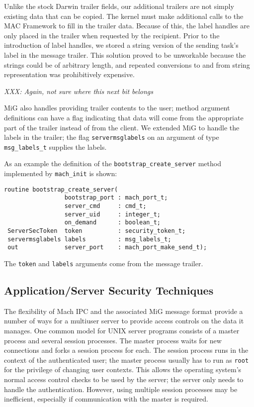 Unlike the stock Darwin trailer fields, our additional trailers are
not simply existing data that can be copied.  The kernel must make
additional calls to the MAC Framework to fill in the trailer data.
Because of this, the label handles are only placed in the trailer
when requested by the recipient. Prior to the introduction of label
handles, we stored a string version of the sending task's label in
the message trailer.  This solution proved to be unworkable because
the strings could be of arbitrary length, and repeated conversions
to and from string representation was prohibitively expensive.

\textit{XXX: Again, not sure where this next bit belongs}

MiG also handles providing trailer contents to the user; method argument definitions can
have a flag indicating that data will come from the appropriate part of the trailer instead
of from the client. We extended MiG to handle the labels in the trailer; the flag
{\tt servermsglabels} on an argument of type {\tt msg\_labels\_t} supplies the labels.
\begin{samepage}
As an example the definition of the {\tt bootstrap\_create\_server} method implemented by
{\tt mach\_init} is shown:
\begin{verbatim}
routine bootstrap_create_server(
                 bootstrap_port : mach_port_t;
                 server_cmd     : cmd_t;
                 server_uid     : integer_t;
                 on_demand      : boolean_t;
 ServerSecToken  token          : security_token_t;
 servermsglabels labels         : msg_labels_t;
 out             server_port    : mach_port_make_send_t);
\end{verbatim}
\end{samepage}

The {\tt token} and {\tt labels} arguments come from the message trailer.

\subsection{Application/Server Security Techniques}

The flexibility of Mach IPC and the associated MiG message format provide a number
of ways for a multiuser server to provide access controls on the data it manages.
One common model for UNIX server programs consists of a master process and several
session processes. The master process waits for new connections and forks a session process
for each. The session process runs in the context of the authenticated user; the master
process usually has to run as {\tt root} for the privilege of changing user contexts.
This allows the operating system's normal access control checks to be used by the server;
the server only needs to handle the authentication.  However, using multiple session processes may
be inefficient, especially if communication with the master is required.

